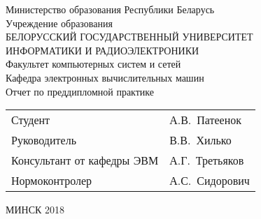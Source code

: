 \begin{titlepage}
  \begin{center}
    Министерство образования Республики Беларусь\\[1em]
    Учреждение образования\\
    БЕЛОРУССКИЙ ГОСУДАРСТВЕННЫЙ УНИВЕРСИТЕТ \\
    ИНФОРМАТИКИ И РАДИОЭЛЕКТРОНИКИ\\[1em]

    Факультет компьютерных систем и сетей \\[0.6cm]

    Кафедра электронных вычислительных машин \\[3.0cm]

    {Отчет по преддипломной практике}\\[4.2cm]

    \begin{tabular}{ p{}p{} }
      Студент & А.В.~Патеенок  \\[1em]

      Руководитель & В.В.~Хилько \\[1em]

      Консультант от кафедры ЭВМ & А.Г.~Третьяков\\[1em]

      Нормоконтролер & А.С.~Сидорович\\
    \end{tabular}

    \vfill
    {\normalsize МИНСК 2018}
  \end{center}
\end{titlepage}

